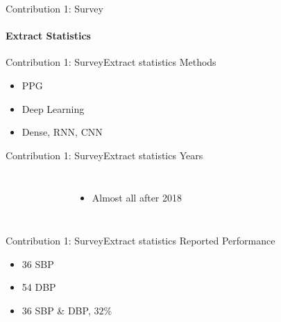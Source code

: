 \begin{frame}{Contribution 1: Survey}
    \framesubtitle{Extract Statistics}
    \centering
    
\end{frame}

\begin{frame}{Contribution 1: Survey}{Extract statistics}
    Methods
    \begin{figure}
        
        \hfill
        
        \hfill
        
    \end{figure}
    \begin{itemize}
        \item PPG
        \item Deep Learning
        \item Dense, RNN, CNN
    \end{itemize}
\end{frame}

\begin{frame}{Contribution 1: Survey}{Extract statistics}
    Years
    \begin{columns}
        \begin{figure}
            
        \end{figure}

        \begin{itemize}
            \item Almost all after 2018
        \end{itemize}
    \end{columns}


\end{frame}

\begin{frame}{Contribution 1: Survey}{Extract statistics}
    Reported Performance

    \begin{figure}
        
        
    \end{figure}

    \begin{itemize}
        \item 36 SBP
        \item 54 DBP
        \item 36 SBP \& DBP, $32\%$
    \end{itemize}
\end{frame}

